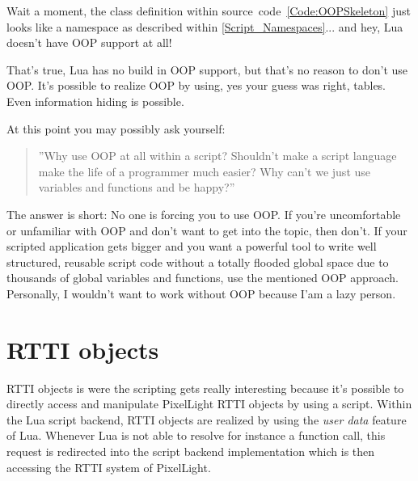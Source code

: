 Wait a moment, the class definition within source~code~\ref{Code:OOPSkeleton} just looks like a namespace as described within \ref{Script_Namespaces}... and hey, Lua doesn't have OOP support at all!

That's true, Lua has no build in OOP support, but that's no reason to don't use OOP. It's possible to realize OOP by using, yes your guess was right, tables. Even information hiding is possible.

At this point you may possibly ask yourself: \begin{quote}''Why use OOP at all within a script? Shouldn't make a script language make the life of a programmer much easier? Why can't we just use variables and functions and be happy?''\end{quote} The answer is short: No one is forcing you to use OOP. If you're uncomfortable or unfamiliar with OOP and don't want to get into the topic, then don't. If your scripted application gets bigger and you want a powerful tool to write well structured, reusable script code without a totally flooded global space due to thousands of global variables and functions, use the mentioned OOP approach. Personally, I wouldn't want to work without OOP because I'am a lazy person.




\section{RTTI objects}
\label{Script_RTTIObjects}
RTTI objects is were the scripting gets really interesting because it's possible to directly access and manipulate PixelLight RTTI objects by using a script. Within the Lua script backend, RTTI objects are realized by using the \emph{user data} feature of Lua. Whenever Lua is not able to resolve for instance a function call, this request is redirected into the script backend implementation which is then accessing the RTTI system of PixelLight.

